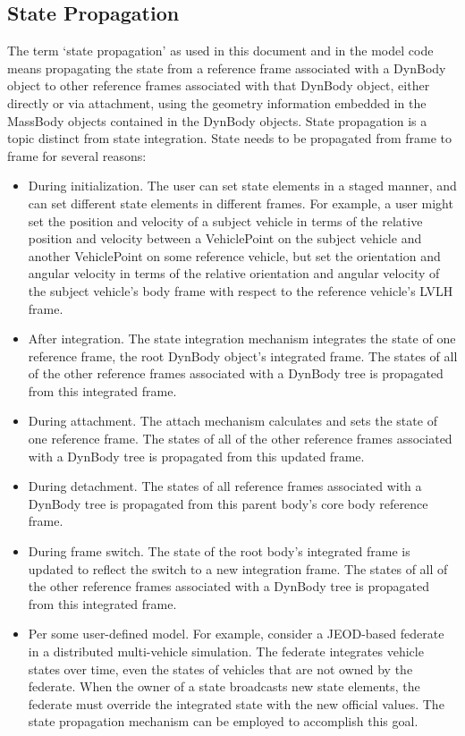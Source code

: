 \subsection{State Propagation}\label{sec:detailed_state_prop}
The term `state propagation' as used in this document and in the model code
means propagating the state from a reference frame associated with a DynBody
object to other reference frames associated with that DynBody object, either
directly or via attachment, using the geometry information embedded in the
MassBody objects contained in the DynBody objects. State propagation is a
topic distinct from state integration. State needs to be propagated from frame
to frame for several reasons:
\begin{itemize}
\item During initialization. The user can set state elements in a staged manner,
and can set different state elements in different frames. For example, a user
might set the position and velocity of a subject vehicle in terms of the
relative position and velocity between a VehiclePoint on the subject vehicle and
another VehiclePoint on some reference vehicle, but set the orientation and
angular velocity in terms of the relative orientation and angular velocity
of the subject vehicle's body frame with respect to the reference vehicle's
LVLH frame.
\item After integration. The state integration mechanism integrates the state
of one reference frame, the root DynBody object's integrated frame. The states
of all of the other reference frames associated with a DynBody tree is propagated from this integrated frame.
\item During attachment. The attach mechanism calculates and sets the state of
one reference frame. The states of all of the other reference frames associated
with a DynBody tree is propagated from this updated frame.
\item During detachment. The states of all reference frames associated with a
DynBody tree is propagated from this parent body's core body reference frame.
\item During frame switch. The state of the root body's integrated frame is
updated to reflect the switch to a new integration frame. The states
of all of the other reference frames associated with a DynBody tree is propagated from this integrated frame.
\item Per some user-defined model. For example, consider a JEOD-based federate
in a distributed multi-vehicle simulation. The federate integrates vehicle
states over time, even the states of vehicles that are not owned by the
federate. When the owner of a state broadcasts new state elements, the federate
must override the integrated state with the new official values. The state
propagation mechanism can be employed to accomplish this goal.
\end{itemize}

